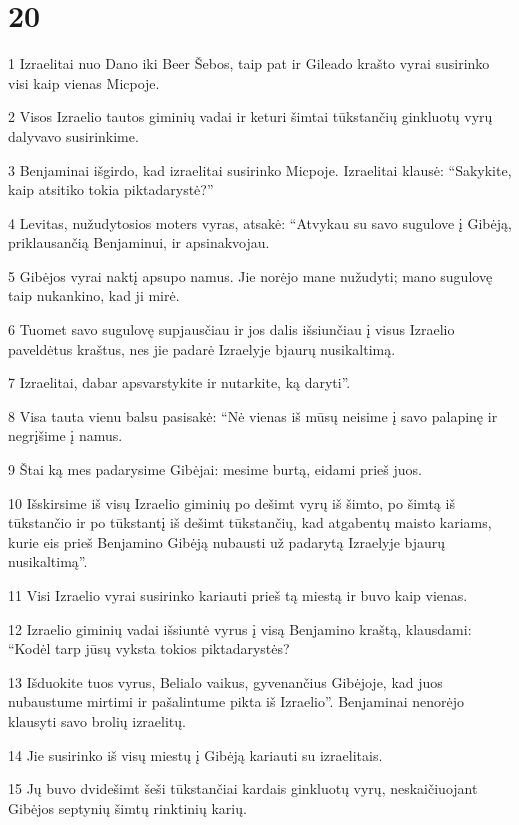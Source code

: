 \chapter{20}

\par 1 Izraelitai nuo Dano iki Beer Šebos, taip pat ir Gileado krašto vyrai susirinko visi kaip vienas Micpoje. 
\par 2 Visos Izraelio tautos giminių vadai ir keturi šimtai tūkstančių ginkluotų vyrų dalyvavo susirinkime. 
\par 3 Benjaminai išgirdo, kad izraelitai susirinko Micpoje. Izraelitai klausė: “Sakykite, kaip atsitiko tokia piktadarystė?” 
\par 4 Levitas, nužudytosios moters vyras, atsakė: “Atvykau su savo sugulove į Gibėją, priklausančią Benjaminui, ir apsinakvojau. 
\par 5 Gibėjos vyrai naktį apsupo namus. Jie norėjo mane nužudyti; mano sugulovę taip nukankino, kad ji mirė. 
\par 6 Tuomet savo sugulovę supjausčiau ir jos dalis išsiunčiau į visus Izraelio paveldėtus kraštus, nes jie padarė Izraelyje bjaurų nusikaltimą. 
\par 7 Izraelitai, dabar apsvarstykite ir nutarkite, ką daryti”. 
\par 8 Visa tauta vienu balsu pasisakė: “Nė vienas iš mūsų neisime į savo palapinę ir negrįšime į namus. 
\par 9 Štai ką mes padarysime Gibėjai: mesime burtą, eidami prieš juos. 
\par 10 Išskirsime iš visų Izraelio giminių po dešimt vyrų iš šimto, po šimtą iš tūkstančio ir po tūkstantį iš dešimt tūkstančių, kad atgabentų maisto kariams, kurie eis prieš Benjamino Gibėją nubausti už padarytą Izraelyje bjaurų nusikaltimą”. 
\par 11 Visi Izraelio vyrai susirinko kariauti prieš tą miestą ir buvo kaip vienas. 
\par 12 Izraelio giminių vadai išsiuntė vyrus į visą Benjamino kraštą, klausdami: “Kodėl tarp jūsų vyksta tokios piktadarystės? 
\par 13 Išduokite tuos vyrus, Belialo vaikus, gyvenančius Gibėjoje, kad juos nubaustume mirtimi ir pašalintume pikta iš Izraelio”. Benjaminai nenorėjo klausyti savo brolių izraelitų. 
\par 14 Jie susirinko iš visų miestų į Gibėją kariauti su izraelitais. 
\par 15 Jų buvo dvidešimt šeši tūkstančiai kardais ginkluotų vyrų, neskaičiuojant Gibėjos septynių šimtų rinktinių karių. 
